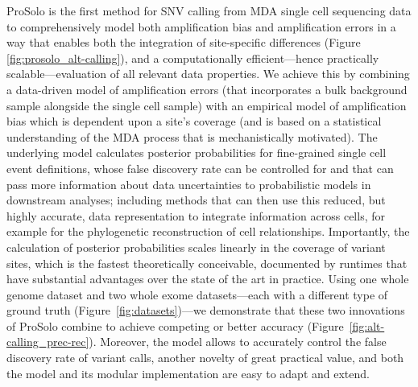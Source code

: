 \documentclass[12pt,inline]{wlscirep}
\begin{document}
ProSolo is the first method for SNV calling from MDA single cell sequencing data to comprehensively model both amplification bias and amplification errors in a way that enables both the integration of site-specific differences (Figure \ref{fig:prosolo_alt-calling}), and a computationally efficient---hence practically scalable---evaluation of all relevant data properties.
We achieve this by combining a data-driven model of amplification errors (that incorporates a bulk background sample alongside the single cell sample) with an empirical model of amplification bias which is dependent upon a site's coverage (and is based on a statistical understanding of the MDA process that is mechanistically motivated).
The underlying model calculates posterior probabilities for fine-grained single cell event definitions, whose false discovery rate can be controlled for and that can pass more information about data uncertainties to probabilistic models in downstream analyses; including methods that can then use this reduced, but highly accurate, data representation to integrate information across cells, for example for the phylogenetic reconstruction of cell relationships.
Importantly, the calculation of posterior probabilities scales linearly in the coverage of variant sites, which is the fastest theoretically conceivable, documented by runtimes that have substantial advantages over the state of the art in practice.
Using one whole genome dataset and two whole exome datasets---each with a different type of ground truth (Figure~\ref{fig:datasets})---we demonstrate that these two innovations of ProSolo combine to achieve competing or better accuracy (Figure~\ref{fig:alt-calling_prec-rec}).
Moreover, the model allows to accurately control the false discovery rate of variant calls, another novelty of great practical value, and both the model and its modular implementation are easy to adapt and extend.
\end{document}
